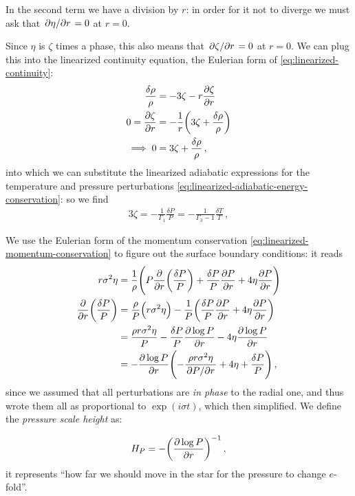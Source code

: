 \documentclass[main.tex]{subfiles}
\begin{document}
In the second term we have a division by \(r\): in order for it not to diverge we must ask that \(\pdv*{\eta }{r} =0\) at \(r=0\). 

Since \(\eta \) is \(\zeta \) times a phase, this also means that \(\pdv*{\zeta }{r} =0 \) at \(r=0\). 
We can plug this into the linearized continuity equation, the Eulerian form of \eqref{eq:linearized-continuity}: 
%
\begin{subequations}
\begin{align}
\frac{ \delta \rho }{\rho } &= - 3\zeta - r\pdv{\zeta }{r} \\
0=\pdv{\zeta }{r} &= - \frac{1}{r} \qty(3\zeta + \frac{ \delta \rho }{\rho })  \\
\implies 0 &= 3\zeta + \frac{ \delta \rho }{\rho }
\,,
\end{align}
\end{subequations}
%
into which we can substitute the linearized adiabatic expressions for the temperature and pressure perturbations \eqref{eq:linearized-adiabatic-energy-conservation}: so we find 
%
\begin{align}
3\zeta = - \frac{1}{\Gamma_1 } \frac{ \delta P }{P}
= - \frac{1}{\Gamma_3 -1} \frac{ \delta T}{T}
\,,
\end{align}
%


We use the Eulerian form of the momentum conservation \eqref{eq:linearized-momentum-conservation} to figure out the surface boundary conditions: it reads 
%
\begin{subequations}
\begin{align}
r \sigma^2 \eta &= 
\frac{1}{\rho } \qty(P \pdv{}{r} \qty(\frac{ \delta P}{P}) 
+ \frac{ \delta P }{P } \pdv{P}{r} 
+ 4 \eta  \pdv{P}{r})  \\
\pdv{}{r} \qty(\frac{ \delta P}{P}) &= \frac{\rho}{P} 
\qty(r \sigma^2 \eta ) - \frac{1}{P} \qty(\frac{ \delta P}{P} \pdv{P}{r} + 4 \eta  \pdv{P}{r})  \\
&= \frac{\rho r \sigma^2 \eta }{P}
- \frac{ \delta P}{P} \pdv{\log P}{r}
- 4 \eta \pdv{\log P}{r}  \\
&= -\pdv{\log P}{r} \qty(- \frac{\rho r \sigma^2 \eta }{\pdv*{P}{r}}
+ 4 \eta
+ \frac{ \delta P}{P} 
) 
\,,
\end{align}
\end{subequations}
%
since we assumed that all perturbations are \emph{in phase} to the radial one, and thus wrote them all as proportional to \(\exp(i \sigma t)\), which then simplified.
We define the \emph{pressure scale height} as:

\begin{equation}
  H_P = - \qty(\pdv{\log P }{r} )^{-1}\,,
\end{equation}
%
it represents ``how far we should move in the star for the pressure to change \(e\)-fold''.
\end{document}
